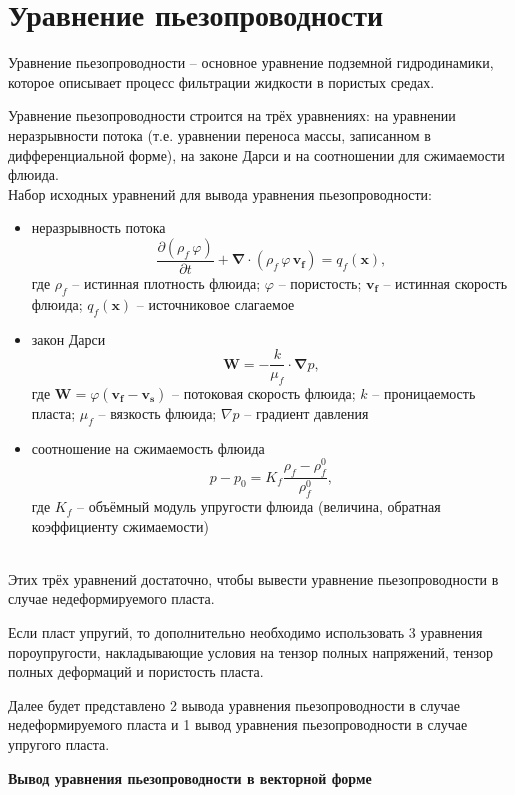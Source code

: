 \documentclass[a4paper,14pt]{extarticle}
\newcommand{\beq}{\begin{equation}}
\newcommand{\eeq}{\end{equation}}
\begin{document}
\section*{Уравнение пьезопроводности}

Уравнение пьезопроводности -- основное уравнение подземной гидродинамики, которое описывает процесс фильтрации жидкости в пористых средах.

Уравнение пьезопроводности строится на трёх уравнениях: на уравнении неразрывности потока (т.е. уравнении переноса массы, записанном в дифференциальной форме), на законе Дарси и на соотношении для сжимаемости флюида.
\\

Набор исходных уравнений для вывода уравнения пьезопроводности:
\begin{itemize}
	\item неразрывность потока
	\beq\label{Continuity}
	\frac{\partial\left(\rho_{\!f}\,\varphi\right)}{\partial t}+\pmb{\nabla}\cdot\left(\rho_{\!f}\,\varphi \, \pmb{v_f}\right)=q_f(\pmb{x}),
	\eeq
	где $\rho_{\!f}$ -- истинная плотность флюида; $\varphi$ -- пористость; $\pmb{v_{\!f}}$ -- истинная скорость флюида; $q_f(\pmb{x})$ -- источниковое слагаемое
	\item закон Дарси
	\beq\label{Darcy}
	\pmb{W}=-\frac{k}{\mu_f}\cdot\pmb{\nabla} p,
	\eeq
	где $\pmb{W}=\varphi\!\left(\pmb{v_{\!f}}-\pmb{v_{\!s}}\right)$ -- потоковая скорость флюида; $k$ -- проницаемость пласта; $\mu_{\!f}$ -- вязкость флюида; $\nabla p$ -- градиент давления
	\item соотношение на сжимаемость флюида
	\beq\label{Compressibility}
	p-p_0=K_{\!f}\frac{\rho_{\!f}-\rho_{\!f}^0}{\rho_{\!f}^0},
	\eeq
	где $K_{\!f}$ -- объёмный модуль упругости флюида (величина, обратная коэффициенту сжимаемости)
\end{itemize}
\ \\
Этих трёх уравнений достаточно, чтобы вывести уравнение пьезопроводности в случае недеформируемого пласта.

Если пласт упругий, то дополнительно необходимо использовать 3 уравнения пороупругости, накладывающие условия на тензор полных напряжений, тензор полных деформаций и пористость пласта.

Далее будет представлено 2 вывода уравнения пьезопроводности в случае недеформируемого пласта и 1 вывод уравнения пьезопроводности в случае упругого пласта.
\newpage

\textbf{Вывод уравнения пьезопроводности в векторной форме}
\end{document}
